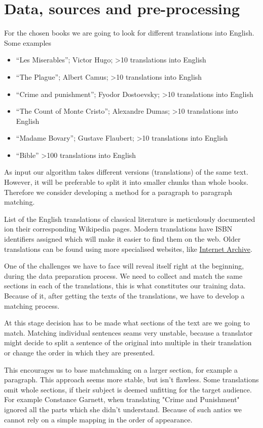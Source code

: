 \documentclass{article}
\begin{document}
\section{Data, sources and pre-processing}
For the chosen books we are going to look for different translations into English. Some examples
\begin{itemize}
    \item ``Les Miserables''; Victor Hugo; >10 translations into English
    \item ``The Plague''; Albert Camus; >10 translations into English
    \item ``Crime and punishment''; Fyodor Dostoevsky; >10 translations into English
    \item ``The Count of Monte Cristo''; Alexandre Dumas; >10 translations into English
    \item ``Madame Bovary''; Gustave Flaubert; >10 translations into English
    \item ``Bible'' >100 translations into English
\end{itemize}
As input our algorithm takes different versions (translations) of the same text. However, it will be preferable to split it into smaller chunks than whole books. Therefore we consider developing a method for a paragraph to paragraph matching.

List of the English translations of classical literature is meticulously documented ion their corresponding Wikipedia pages. Modern translations have ISBN identifiers assigned which will make it easier to find them on the web. Older translations can be found using more specialised websites, like \href{https://archive.org/}{Internet Archive}.

One of the challenges we have to face will reveal itself right at the beginning, during the data preparation process. We need to collect and match the same sections in each of the translations, this is what constitutes our training data. Because of it, after getting the texts of the translations, we have to develop a matching process. 

At this stage decision has to be made what sections of the text are we going to match. Matching individual sentences seams very unstable, because a translator might decide to split a sentence of the original into multiple in their translation or change the order in which they are presented. 

This encourages us to base matchmaking on a larger section, for example a paragraph. This approach seems more stable, but isn't flawless. Some translations omit whole sections, if their subject is deemed unfitting for the target audience. For example Constance Garnett, when translating "Crime and Punishment" ignored all the parts which she didn't understand. Because of such antics we cannot rely on a simple mapping in the order of appearance.  
\end{document}
